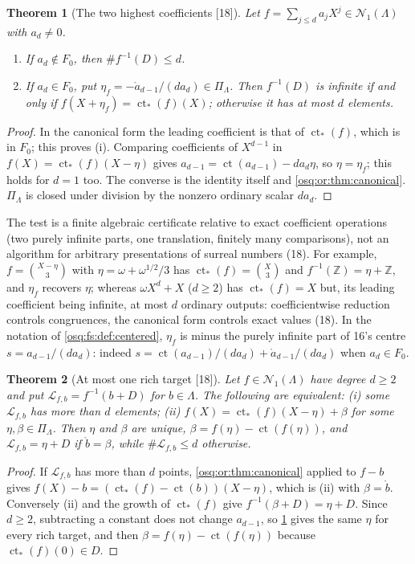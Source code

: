 \documentclass[11pt,letterpaper]{article}
\numberwithin{equation}{section}
\newtheorem{theorem}{Theorem}[section]
\theoremstyle{definition}
\theoremstyle{remark}
\theoremstyle{plain}
\newcommand{\Z}{\mathbb Z}
\newcommand{\ct}{\operatorname{ct}}
\newcommand{\Num}{\mathscr N}
\newcommand{\src}[1]{\textup{\textsf{[#1]}}}
\begin{document}
\begin{theorem}[The two highest coefficients \src{18}]\label{osq:or:thm:eta}
Let $f=\sum_{j\le d}a_jX^j\in\Num_1(\Lambda)$ with $a_d\ne0$.
\begin{enumerate}
\item If $a_d\notin F_0$, then $\#f^{-1}(D)\le d$.
\item If $a_d\in F_0$, put $\eta_f=-\mathring a_{d-1}/(da_d)\in\Pi_\Lambda$. Then $f^{-1}(D)$ is infinite if and only if $f(X+\eta_f)=\ct_*(f)(X)$; otherwise
it has at most $d$ elements.
\end{enumerate}
\end{theorem}
\begin{proof}
In the canonical form the leading coefficient is that of $\ct_*(f)$, which is in $F_0$; this proves (i). Comparing coefficients of $X^{d-1}$ in
$f(X)=\ct_*(f)(X-\eta)$ gives $a_{d-1}=\ct(a_{d-1})-da_d\eta$, so $\eta=\eta_f$; this holds for $d=1$ too. The converse is the identity itself and
\cref{osq:or:thm:canonical}. $\Pi_\Lambda$ is closed under division by the nonzero ordinary scalar $da_d$.
\end{proof}

The test is a finite algebraic certificate relative to exact coefficient operations (two purely infinite parts, one translation, finitely many
comparisons), not an algorithm for arbitrary presentations of surreal numbers (18). For example, $f=\binom{X-\eta}3$ with
$\eta=\omega+\omega^{1/2}/3$ has $\ct_*(f)=\binom X3$ and $f^{-1}(\Z)=\eta+\Z$, and $\eta_f$ recovers $\eta$; whereas $\omega X^d+X$ ($d\ge2$) has
$\ct_*(f)=X$ but, its leading coefficient being infinite, at most $d$ ordinary outputs: coefficientwise reduction controls congruences, the
canonical form controls exact values (18). In the notation of \cref{osq:fs:def:centered}, $\eta_f$ is minus the purely infinite part of 16's centre
$s=a_{d-1}/(da_d)$: indeed $s=\ct(a_{d-1})/(da_d)+\mathring a_{d-1}/(da_d)$ when $a_d\in F_0$.

\begin{theorem}[At most one rich target \src{18}]\label{osq:or:thm:targets}
Let $f\in\Num_1(\Lambda)$ have degree $d\ge2$ and put $\mathcal L_{f,b}=f^{-1}(b+D)$ for $b\in\Lambda$. The following are equivalent: (i) some
$\mathcal L_{f,b}$ has more than $d$ elements; (ii) $f(X)=\ct_*(f)(X-\eta)+\beta$ for some $\eta,\beta\in\Pi_\Lambda$. Then $\eta$ and $\beta$ are
unique, $\beta=f(\eta)-\ct(f(\eta))$, and $\mathcal L_{f,b}=\eta+D$ if $\mathring b=\beta$, while $\#\mathcal L_{f,b}\le d$ otherwise.
\end{theorem}
\begin{proof}
If $\mathcal L_{f,b}$ has more than $d$ points, \cref{osq:or:thm:canonical} applied to $f-b$ gives $f(X)-b=(\ct_*(f)-\ct(b))(X-\eta)$, which is (ii)
with $\beta=\mathring b$. Conversely (ii) and the growth of $\ct_*(f)$ give $f^{-1}(\beta+D)=\eta+D$. Since $d\ge2$, subtracting a constant does not
change $a_{d-1}$, so \cref{osq:or:thm:eta} gives the same $\eta$ for every rich target, and then $\beta=f(\eta)-\ct(f(\eta))$ because
$\ct_*(f)(0)\in D$.
\end{proof}
\end{document}
